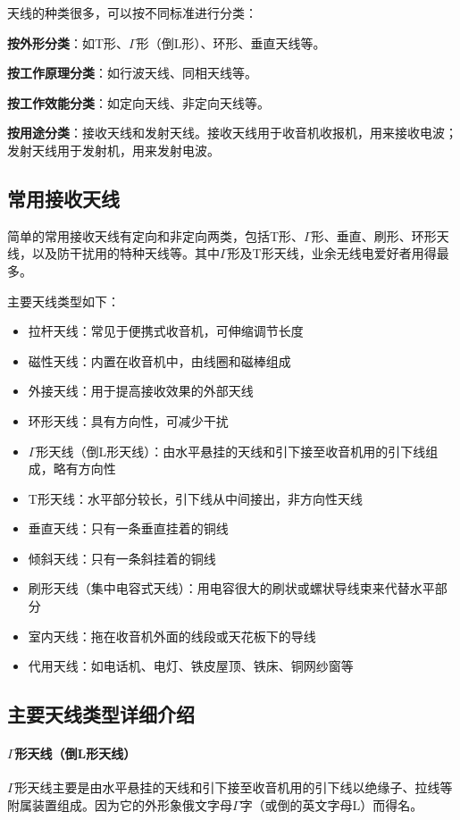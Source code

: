 \documentclass[12pt,UTF8]{ctexbook}
\begin{document}
天线的种类很多，可以按不同标准进行分类：

\textbf{按外形分类}：如T形、$\Gamma$形（倒L形）、环形、垂直天线等。

\textbf{按工作原理分类}：如行波天线、同相天线等。

\textbf{按工作效能分类}：如定向天线、非定向天线等。

\textbf{按用途分类}：接收天线和发射天线。接收天线用于收音机收报机，用来接收电波；发射天线用于发射机，用来发射电波。

\subsection{常用接收天线}

简单的常用接收天线有定向和非定向两类，包括T形、$\Gamma$形、垂直、刷形、环形天线，以及防干扰用的特种天线等。其中$\Gamma$形及T形天线，业余无线电爱好者用得最多。

主要天线类型如下：

\begin{itemize}[leftmargin=3.5em]
\item 拉杆天线：常见于便携式收音机，可伸缩调节长度
\item 磁性天线：内置在收音机中，由线圈和磁棒组成
\item 外接天线：用于提高接收效果的外部天线
\item 环形天线：具有方向性，可减少干扰
\item $\Gamma$形天线（倒L形天线）：由水平悬挂的天线和引下接至收音机用的引下线组成，略有方向性
\item T形天线：水平部分较长，引下线从中间接出，非方向性天线
\item 垂直天线：只有一条垂直挂着的铜线
\item 倾斜天线：只有一条斜挂着的铜线
\item 刷形天线（集中电容式天线）：用电容很大的刷状或螺状导线束来代替水平部分
\item 室内天线：拖在收音机外面的线段或天花板下的导线
\item 代用天线：如电话机、电灯、铁皮屋顶、铁床、铜网纱窗等
\end{itemize}

\subsection{主要天线类型详细介绍}

\paragraph{$\Gamma$形天线（倒L形天线）}
$\Gamma$形天线主要是由水平悬挂的天线和引下接至收音机用的引下线以绝缘子、拉线等附属装置组成。因为它的外形象俄文字母$\Gamma$字（或倒的英文字母L）而得名。
   
\end{document}
